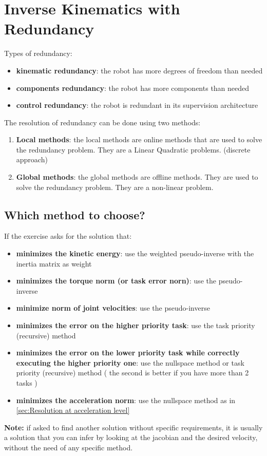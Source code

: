 \documentclass[a4paper,12pt]{article}
\begin{document}
\section{Inverse Kinematics with Redundancy}
Types of redundancy:
\begin{itemize}
    \item \textbf{kinematic redundancy}: the robot has more degrees of freedom than needed
    \item \textbf{components redundancy}: the robot has more
     components than needed
     \item \textbf{control redundancy}: the robot is redundant in its supervision
     architecture
\end{itemize}
    The resolution of redundancy can be done using two methods:
\begin{enumerate}
    \item \textbf{Local methods}: the local methods are online methods
     that are used to solve the redundancy problem. They are a Linear Quadratic problems.
     (discrete approach)
    \item \textbf{Global methods}: the global methods are offline methods.
     They are used to solve the redundancy problem. They are a
      non-linear problem.
\end{enumerate}
\subsection{Which method to choose?}
If the exercise asks for the solution that:
\begin{itemize}
    \item \textbf{minimizes the kinetic energy}: use the weighted pseudo-inverse with the inertia matrix as weight
    \item \textbf{minimizes the torque norm (or task error norn)}: use the pseudo-inverse
    \item \textbf{minimize norm of joint velocities}: use the pseudo-inverse
    \item \textbf{minimizes the error on the higher priority task}: use the task priority (recursive) method
    \item \textbf{minimizes the error on the lower priority task while correctly executing the higher priority one}: use the nullspace method or task priority (recursive) method (
        the second is better if you have more than 2 tasks
    )
    \item \textbf{minimizes the acceleration norm}: use the nullspace method as in \ref{sec:Resolution at acceleration level}
\end{itemize}
\textbf{Note:} if asked to find another solution without 
specific requirements, it is usually a solution that you can 
infer by looking
at the jacobian and the desired velocity, without 
the need of any specific method.
\end{document}

